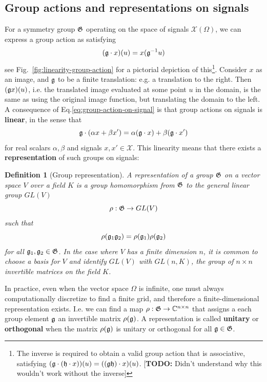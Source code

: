 \documentclass[11pt]{article}
\numberwithin{equation}{section}
\newtheorem{defn}{Definition}[section]
\begin{document}
\subsection{Group actions and representations on signals}
For a symmetry group $\mathfrak{G}$ operating on the space of signals $\mathcal{X}(\Omega)$, we can express a group action as satisfying
\begin{equation}
(\mathfrak{g}\cdot x)(u) = x(\mathfrak{g}^{-1}u) \label{eq:group-action-on-signal}
\end{equation}
see Fig.~\ref{fig:linearity-group-action} for a pictorial depiction of this\footnote{The inverse is required to obtain a valid group action that is associative, satisfying $(\mathfrak{g}\cdot(\mathfrak{h}\cdot x))(u) = ((\mathfrak{gh})\cdot x)(u)$. [\textbf{TODO:} Didn't understand why this wouldn't work without the inverse]}. Consider $x$ as an image, and $\mathfrak{g}$ to be a finite translation: e.g. a translation to the right. Then $(\mathfrak{g}x)(u)$, i.e. the translated image evaluated at some point $u$ in the domain, is the same as using the original image function, but translating the domain to the left. A consequence of Eq.\eqref{eq:group-action-on-signal} is that group actions on signals is \textbf{linear}, in the sense that
\begin{equation}
\mathfrak{g}\cdot(\alpha x + \beta x') = \alpha (\mathfrak{g}\cdot x) + \beta(\mathfrak{g} \cdot x')
\end{equation}
for real scalars $\alpha, \beta$ and signals $x, x' \in \mathcal{X}$. This linearity means that there exists a \textbf{representation} of such groups on signals:
\begin{defn}[Group representation]
A representation of a group $\mathfrak{G}$ on a vector space $V$ over a field $K$ is a group homomorphism from $\mathfrak{G}$ to the general linear group $GL(V)$
\begin{equation}
\rho: \mathfrak{G} \rightarrow GL(V)
\end{equation}
such that 
\begin{equation}
\rho(\mathfrak{g}_1 \mathfrak{g}_2) = \rho(\mathfrak{g}_1) \rho(\mathfrak{g}_2)
\end{equation}
for all $\mathfrak{g}_1, \mathfrak{g}_2 \in \mathfrak{G}$. In the case where $V$ has a finite dimension $n$, it is common to choose a basis for $V$ and identify $GL(V)$ with $GL(n, K)$, the group of $n \times n$ invertible matrices on the field $K$.
\end{defn}
In practice, even when the vector space $\Omega$ is infinite, one must always computationally discretize to find a finite grid, and therefore a finite-dimensional representation exists. I.e. we can find a map $\rho : \mathfrak{G} \rightarrow \mathbb{C}^{n \times n}$ that assigns a each group element $\mathfrak{g}$ an invertible matrix $\rho(\mathfrak{g})$. A representation is called \textbf{unitary} or \textbf{orthogonal} when the matrix $\rho(\mathfrak{g})$ is unitary or orthogonal for all $\mathfrak{g} \in \mathfrak{G}$.
\end{document}
